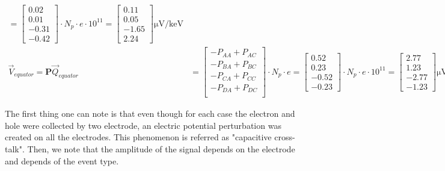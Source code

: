 \begin{align}
= 
\begin{bmatrix}
0.02 \\ 0.01 \\ -0.31 \\ -0.42
\end{bmatrix}
\cdot N_p \cdot e \cdot 10^{11}
= 
\begin{bmatrix}
0.11 \\ 0.05 \\ -1.65 \\ 2.24
\end{bmatrix}
\si{\micro\volt\per\kilo\eV}
\\
\vec{V}_{equator} = \bm{P} \vec{Q}_{equator} &=
\begin{bmatrix}
- P_{AA} + P_{AC} \\
- P_{BA} + P_{BC} \\
- P_{CA} + P_{CC} \\
- P_{DA} + P_{DC} \\
\end{bmatrix}
\cdot N_p \cdot e
= 
\begin{bmatrix}
0.52 \\ 0.23 \\ -0.52 \\ -0.23
\end{bmatrix}
\cdot N_p \cdot e \cdot 10^{11}
= 
\begin{bmatrix}
2.77 \\ 1.23 \\ -2.77 \\ -1.23
\end{bmatrix}
\si{\micro\volt\per\kilo\eV}
\end{align}

The first thing one can note is that even though for each case the electron and hole were collected by two electrode, an electric potential perturbation was created on all the electrodes. This phenomenon is referred as "capacitive cross-talk". Then, we note that the amplitude of the signal depends on the electrode and depends of the event type.

%
%

